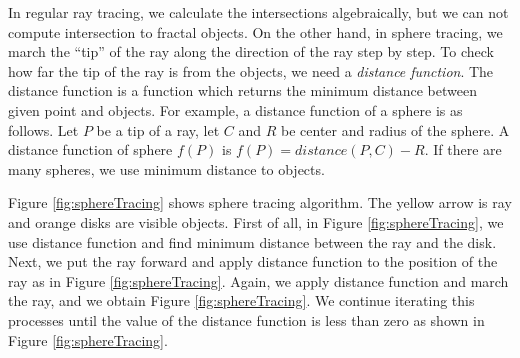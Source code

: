 In regular ray tracing, we calculate the intersections algebraically, but
we can not compute intersection to fractal objects.
On the other hand, in sphere tracing, we march the ``tip'' of the ray
along the direction of the ray step by step. 
To check how far the tip of the ray is from the objects, we need a
\textit{distance function}.
The distance function is a function which returns the minimum distance
between given point and objects.
For example, a distance function of a sphere is as follows.
Let $P$ be a tip of a ray, let $C$ and $R$ be center and
radius of the sphere.
A distance function of sphere $f(P)$ is $f(P) = distance(P, C) - R$.
If there are many spheres, we use minimum distance to objects.

Figure \ref{fig:sphereTracing} shows sphere tracing algorithm.
The yellow arrow is ray and orange disks are visible objects.
First of all, in Figure \ref{fig:sphereTracing},
we use distance function and find minimum distance between
the ray and the disk.
Next, we put the ray forward and apply distance function to the position
of the ray as in Figure \ref{fig:sphereTracing}.
Again, we apply distance function and march the ray, and we obtain
Figure \ref{fig:sphereTracing}.
We continue iterating this processes until the value of the distance
function is less than zero as shown in Figure \ref{fig:sphereTracing}.


